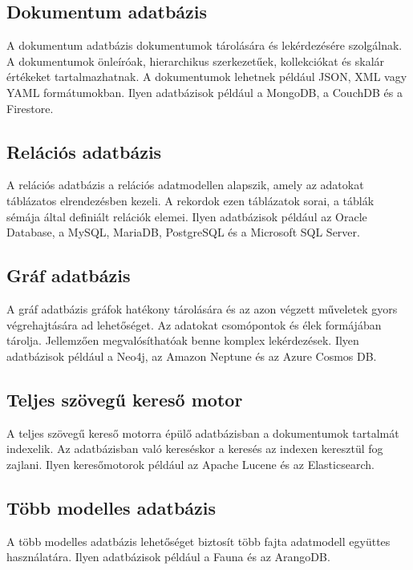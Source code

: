 \subsection{Dokumentum adatbázis}

A dokumentum adatbázis dokumentumok tárolására és lekérdezésére szolgálnak. A dokumentumok önleíróak, hierarchikus szerkezetűek, kollekciókat és skalár értékeket tartalmazhatnak. A dokumentumok lehetnek például JSON, XML vagy YAML formátumokban. Ilyen adatbázisok például a MongoDB, a CouchDB és a Firestore.

\subsection{Relációs adatbázis}

A relációs adatbázis a relációs adatmodellen alapszik, amely az adatokat táblázatos elrendezésben kezeli. A rekordok ezen táblázatok sorai, a táblák sémája által definiált relációk elemei. Ilyen adatbázisok például az Oracle Database, a MySQL, MariaDB, PostgreSQL és a Microsoft SQL Server.

\subsection{Gráf adatbázis}

A gráf adatbázis gráfok hatékony tárolására és az azon végzett műveletek gyors végrehajtására ad lehetőséget. Az adatokat csomópontok és élek formájában tárolja. Jellemzően megvalósíthatóak benne komplex lekérdezések. Ilyen adatbázisok például a Neo4j, az Amazon Neptune és az Azure Cosmos DB.

\subsection{Teljes szövegű kereső motor}

A teljes szövegű kereső motorra épülő adatbázisban a dokumentumok tartalmát indexelik. Az adatbázisban való kereséskor a keresés az indexen keresztül fog zajlani. Ilyen keresőmotorok például az Apache Lucene és az Elasticsearch.

\subsection{Több modelles adatbázis}

A több modelles adatbázis lehetőséget biztosít több fajta adatmodell együttes használatára. Ilyen adatbázisok például a Fauna és az ArangoDB.

